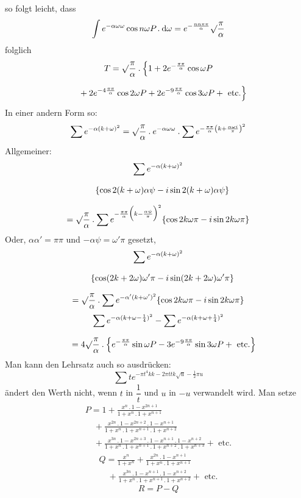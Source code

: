 so folgt leicht, dass
\[
\int e^{-\alpha\omega\omega}\cos n\omega P\mathbin{.}\mathrm{d}\omega
=e^{-\frac{nn\pi\pi}{\alpha}}\surd\frac{\pi}{\alpha}
\]
folglich
\[
\begin{gathered}T=\surd\frac{\pi}{\alpha}\mathbin{.}
\Bigl\{1+2e^{-\frac{\pi\pi}{\alpha}}\cos\omega P
\\[7pt]\quad{}+2e^{-4\frac{\pi\pi}{\alpha}}\cos2\omega P
+2e^{-9\frac{\pi\pi}{\alpha}}\cos3\omega P+\text{ etc.}\Bigr\}\end{gathered}
\]
In einer andern Form so:
\[
\sum e^{-\alpha(k+\omega)^2}
=\surd\frac{\pi}{\alpha}\mathbin{.}e^{-\alpha\omega\omega}\mathbin{.}
\sum e^{-\frac{\pi\pi}{\alpha}\left(k+\frac{\alpha\omega i}{\pi}\right)^2}
\]
Allgemeiner:
\[
\begin{gathered}
\sum e^{-\alpha(k+\omega)^2}\\[7pt]\quad{}\{\cos2(k+\omega)\alpha\psi-i\sin2(k+\omega)\alpha\psi\}\\[7pt]
=\surd\frac{\pi}{\alpha}\mathbin{.}
\sum e^{-\frac{\pi\pi}{\alpha}\Bigl(k-\frac{\alpha\psi}{\pi}\Bigr)^2}
\{\cos2k\omega\pi-i\sin2k\omega\pi\}
\end{gathered}
\]
Oder, $\alpha\alpha'=\pi\pi$ und $-\alpha\psi=\omega'\pi$ gesetzt,
\[
\begin{gathered}
\sum e^{-\alpha(k+\omega)^2}\\[7pt]\quad{}\{\cos(2k+2\omega)\omega'\pi-i\sin(2k+2\omega)\omega'\pi\}\\[7pt]
=\surd\frac{\pi}{\alpha}\mathbin{.}\sum e^{-\alpha'(k+\omega')^2}
\{\cos2k\omega\pi-i\sin2k\omega\pi\}
\end{gathered}
\]
\[
\begin{gathered}\sum e^{-\alpha(k+\omega-\frac14)^2}-\sum e^{-\alpha(k+\omega+\frac14)^2}
\\[7pt]\quad{}=4\surd\frac{\pi}{\alpha}\mathbin{.}
\Bigl\{e^{-\frac{\pi\pi}{\alpha}}\sin\omega P
-3e^{-9\frac{\pi\pi}{\alpha}}\sin3\omega P+\text{ etc.}\Bigr\}\end{gathered}
\]
Man kann den Lehrsatz auch so ausdrücken:
\[
\sum t e^{-\pi t^{4}kk-2\pi ttk\surd u-\frac12\pi u}
\]
ändert den Werth nicht, wenn $t$ in $\dfrac1t$ und $u$ in $-u$ verwandelt wird.
Man setze
\[
\begin{gathered}P=1+\frac{x^n\mathbin{.}1-x^{2n+1}}{1+x^n\mathbin{.}1+x^{n+1}}
\\[7pt]\quad{}+\frac{x^{2n}\mathbin{.}1-x^{2n+2}\mathbin{.}1-x^{n+1}}{1+x^n\mathbin{.}1+x^{n+1}\mathbin{.}1+x^{n+2}}
\\[7pt]\quad{}+\frac{x^{3n}\mathbin{.}1-x^{2n+3}\mathbin{.}1-x^{n+1}\mathbin{.}1-x^{n+2}}{1+x^n\mathbin{.}1+x^{n+1}\mathbin{.}1+x^{n+2}\mathbin{.}1+x^{n+3}}
+\text{ etc.}\end{gathered}
\]
\[
\begin{gathered}Q=\frac{x^n}{1+x^n}
+\frac{x^{2n}\mathbin{.}1-x^{n+1}}{1+x^n\mathbin{.}1+x^{n+1}}
\\[7pt]\quad{}+\frac{x^{3n}\mathbin{.}1-x^{n+1}\mathbin{.}1-x^{n+2}}{1+x^n\mathbin{.}1+x^{n+1}\mathbin{.}1+x^{n+2}}
+\text{ etc.}\end{gathered}
\]
\[
R=P-Q
\]

